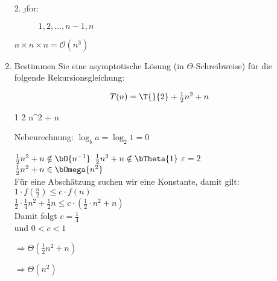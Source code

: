 \documentclass{bschlangaul-aufgabe}
\begin{document}
\begin{enumerate}
\begin{bAntwort}
\begin{description}
\item[2. \j{for}:]
$1, 2, \dots, n-1, n$
\end{description}

$n \times n \times n = \mathcal{O}(n^3)$
\end{bAntwort}


\item Bestimmen Sie eine asymptotische Lösung (in $\Theta$-Schreibweise)
für die folgende Rekursionsgleichung:

\def\fn{\textstyle{\frac{1}{2}}n^2 + n}

\begin{displaymath}
T(n) = \T{}{2} + \fn
\end{displaymath}

\bMasterExkurs

\begin{bAntwort}

\bMasterVariablenDeklaration
{1} %
{2} %
{\fn} %

Nebenrechnung: $\log_b a = \log_2 1 = 0$

\bMasterFallRechnung
{$\fn \notin \bO{n^{-1}}$}
{$\fn \notin \bTheta{1}$}
{$\varepsilon = 2$ \\
$\fn \in \bOmega{n^2}$ \\
Für eine Abschätzung suchen wir eine Konstante, damit gilt: \\
$1 \cdot f(\frac{n}{2}) \leq c \cdot f(n)$ \\
$\frac{1}{2} \cdot \frac{1}{4} n^2 + \frac{1}{2}n  \leq c \cdot (\frac{1}{2} \cdot n^2 + n)$ \\
Damit folgt $c = \frac{1}{4}$ \\
und $0 < c < 1$}

$\Rightarrow \Theta(\frac{1}{2}n^2 + n)$

$\Rightarrow \Theta(n^2)$

\end{bAntwort}
\end{enumerate}
\end{document}
